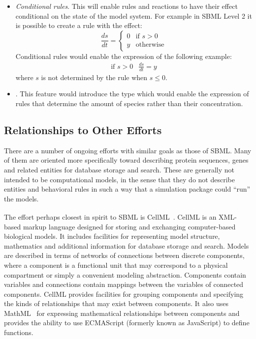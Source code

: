 \documentclass[10pt,twocolumntoc]{cekarticle}
\newcommand{\D}{\displaystyle}
\newcommand{\tm}{\textsuperscript{\tiny{\texttrademark}}}
\begin{document}
\begin{itemize}
\item \emph{Conditional rules}.  This will enable rules and reactions to have
their effect conditional on the state of the model system.  For example in
SBML Level 2 it is possible to create a rule with the effect:
\begin{equation*}
\frac{d s}{d t} =
\left\{
\begin{array}{ll}
     0 & \mbox{if $s>0$}\\
     y & \mbox{otherwise}
\end{array}
\right.
\end{equation*}
Conditional rules would enable the expression of the following example:
\begin{equation*}
\begin{array}{ll}
\mbox{if $s>0$} & \D\frac{d s}{d t} = y 
\end{array}
\end{equation*}
where $s$ is not determined by the rule when $s \leq 0$.
\item \emph{}.  This feature would introduce the type  which would enable the expression of rules that determine the amount of species rather than their concentration.
\end{itemize}


\subsection{Relationships to Other Efforts}
\label{sec:other-efforts}

There are a number of ongoing efforts with similar goals as those of SBML.
Many of them are oriented more specifically toward describing protein
sequences, genes and related entities for database storage and search.
These are generally not intended to be computational models, in the sense
that they do not describe entities and behavioral rules in such a way that
a simulation package could ``run'' the models.

The effort perhaps closest in spirit to SBML is
CellML\tm~\citep{hedley:2001b}.  CellML is an XML-based markup language
designed for storing and exchanging computer-based biological models.  It
includes facilities for representing model structure, mathematics and
additional information for database storage and search.  Models are
described in terms of networks of connections between discrete components,
where a component is a functional unit that may correspond to a physical
compartment or simply a convenient modeling abstraction.  Components
contain variables and connections contain mappings between the variables of
connected components.  CellML provides facilities for grouping components
and specifying the kinds of relationships that may exist between
components.  It also uses MathML~\citep{w3c:2000b} for expressing
mathematical relationships between components and provides the ability to
use ECMAScript (formerly known as JavaScript) to define functions.
\end{document}
